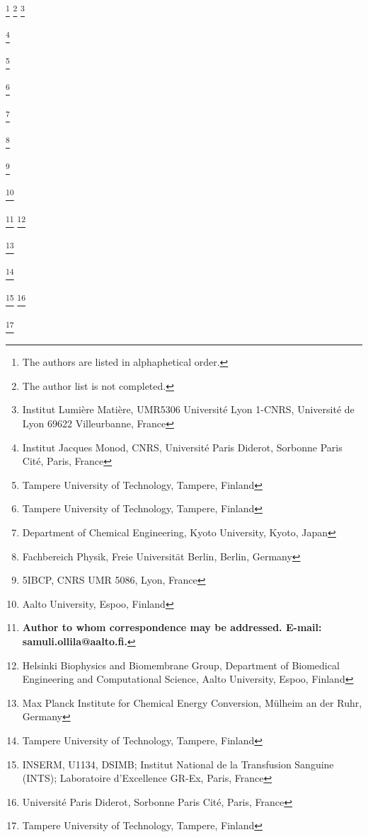 \documentclass[pre,aps,floatfix,authordate1-4,twocolumn]{revtex4-1}
\begin{document}
\author{Alexandru Botan}
\thanks{The authors are listed in alphaphetical order.}
\thanks{The author list is not completed.}
\thanks{Institut Lumi\`ere Mati\`ere, UMR5306 Universit\'e Lyon 1-CNRS, Universit\'e de Lyon 69622 Villeurbanne, France}
%
\author{Fernando Favela}
\author{Patrick Fuchs}
\thanks{Institut Jacques Monod, CNRS, Universit\'e Paris Diderot, Sorbonne Paris Cit\'e, Paris, France}
\author{Matti Javanainen}
\thanks{Tampere University of Technology, Tampere, Finland}
\author{Waldemar Kulig}
\thanks{Tampere University of Technology, Tampere, Finland}
\author{Antti Lamberg}
\thanks{Department of Chemical Engineering, Kyoto University, Kyoto, Japan}
\author{Markus S. Miettinen}
\thanks{Fachbereich Physik, Freie Universit\"at Berlin, Berlin, Germany}
\author{Luca Monticelli}
\thanks{5IBCP, CNRS UMR 5086, Lyon, France}
\author{Jukka M\"a\"att\"a}
\thanks{Aalto University, Espoo, Finland}
\author{O. H. Samuli Ollila} 
\thanks{{\bf Author to whom correspondence may be addressed. E-mail: samuli.ollila@aalto.fi.}}
\thanks{Helsinki Biophysics and Biomembrane Group, Department of Biomedical Engineering and Computational Science, Aalto University, Espoo, Finland}
\author{Marius Retegan}
\thanks{Max Planck Institute for Chemical Energy Conversion, M\"ulheim an der Ruhr, Germany}
\author{Tomasz Rog}
\thanks{Tampere University of Technology, Tampere, Finland}
\author{Hubert Santuz}
\thanks{INSERM, U1134, DSIMB; Institut National de la Transfusion Sanguine (INTS); Laboratoire d'Excellence GR-Ex, Paris, France}
\thanks{Universit\'e Paris Diderot, Sorbonne Paris Cit\'e, Paris, France}
\author{Joona Tynkkynen}
\thanks{Tampere University of Technology, Tampere, Finland}
\end{document}
